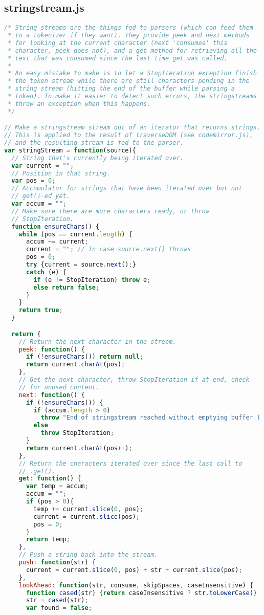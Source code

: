 \subsection{stringstream.js}
\begin{lstlisting}[language=Javascript]
/* String streams are the things fed to parsers (which can feed them
 * to a tokenizer if they want). They provide peek and next methods
 * for looking at the current character (next 'consumes' this
 * character, peek does not), and a get method for retrieving all the
 * text that was consumed since the last time get was called.
 *
 * An easy mistake to make is to let a StopIteration exception finish
 * the token stream while there are still characters pending in the
 * string stream (hitting the end of the buffer while parsing a
 * token). To make it easier to detect such errors, the stringstreams
 * throw an exception when this happens.
 */

// Make a stringstream stream out of an iterator that returns strings.
// This is applied to the result of traverseDOM (see codemirror.js),
// and the resulting stream is fed to the parser.
var stringStream = function(source){
  // String that's currently being iterated over.
  var current = "";
  // Position in that string.
  var pos = 0;
  // Accumulator for strings that have been iterated over but not
  // get()-ed yet.
  var accum = "";
  // Make sure there are more characters ready, or throw
  // StopIteration.
  function ensureChars() {
    while (pos == current.length) {
      accum += current;
      current = ""; // In case source.next() throws
      pos = 0;
      try {current = source.next();}
      catch (e) {
        if (e != StopIteration) throw e;
        else return false;
      }
    }
    return true;
  }

  return {
    // Return the next character in the stream.
    peek: function() {
      if (!ensureChars()) return null;
      return current.charAt(pos);
    },
    // Get the next character, throw StopIteration if at end, check
    // for unused content.
    next: function() {
      if (!ensureChars()) {
        if (accum.length > 0)
          throw "End of stringstream reached without emptying buffer ('" + accum + "').";
        else
          throw StopIteration;
      }
      return current.charAt(pos++);
    },
    // Return the characters iterated over since the last call to
    // .get().
    get: function() {
      var temp = accum;
      accum = "";
      if (pos > 0){
        temp += current.slice(0, pos);
        current = current.slice(pos);
        pos = 0;
      }
      return temp;
    },
    // Push a string back into the stream.
    push: function(str) {
      current = current.slice(0, pos) + str + current.slice(pos);
    },
    lookAhead: function(str, consume, skipSpaces, caseInsensitive) {
      function cased(str) {return caseInsensitive ? str.toLowerCase() : str;}
      str = cased(str);
      var found = false;


\end{lstlisting}
